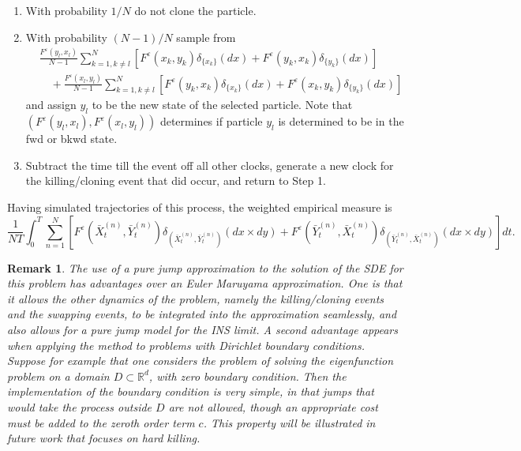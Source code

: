 \documentclass[english,11pt]{article}%
\newtheorem{remark}[theorem]{Remark}
\numberwithin{equation}{section}
\numberwithin{example}{section}
\numberwithin{theorem}{section}
\begin{document}
\begin{enumerate}
\begin{enumerate}
\item With probability $1/N$ do not clone the particle.

\item With probability $(N-1)/N$ sample from
\begin{align*}
&  \frac{F^{\varepsilon}(y_{l},x_{l})}{N-1}\sum_{k=1,k\neq l}^{N}\left[
F^{\varepsilon}(x_{k},y_{k})\delta_{\{x_{k}\}}(dx)+F^{\varepsilon}(y_{k}%
,x_{k})\delta_{\{y_{k}\}}(dx)\right] \\
&  \quad+\frac{F^{\varepsilon}(x_{l},y_{l})}{N-1}\sum_{k=1,k\neq l}^{N}\left[
F^{\varepsilon}(y_{k},x_{k})\delta_{\{x_{k}\}}(dx)+F^{\varepsilon}(x_{k}%
,y_{k})\delta_{\{y_{k}\}}(dx)\right]
\end{align*}
and assign $y_{l}$ to be the new state of the selected particle. Note that
$(F^{\varepsilon}(y_{l},x_{l}),F^{\varepsilon}(x_{l},y_{l}))$ determines if
particle $y_{l}$ is determined to be in the fwd or bkwd state.


\item Subtract the time till the event off all other clocks, generate a new
clock for the killing/cloning event that did occur, and return to Step 1.
\end{enumerate}
\end{enumerate}

Having simulated trajectories of this process, the weighted empirical measure
is
\[
\frac{1}{NT}\int_{0}^{T}\sum_{n=1}^{N}\left[  F^{\varepsilon}(\bar{X}%
_{t}^{(n)},\bar{Y}_{t}^{(n)})\delta_{(\bar{X}_{t}^{(n)},\bar{Y}_{t}^{(n)}%
)}(dx\times dy)+F^{\varepsilon}(\bar{Y}_{t}^{(n)},\bar{X}_{t}^{(n)}%
)\delta_{(\bar{Y}_{t}^{(n)},\bar{X}_{t}^{(n)})}(dx\times dy)\right]  dt.
\]


\begin{remark}
\label{rem:jump} The use of a pure jump approximation to the solution of the
SDE for this problem has advantages over an Euler Maruyama approximation. One
is that it allows the other dynamics of the problem, namely the
killing/cloning events and the swapping events, to be integrated into the
approximation seamlessly, and also allows for a pure jump model for the INS
limit. A second advantage appears when applying the method to problems with
Dirichlet boundary conditions. Suppose for example that one considers the
problem of solving the eigenfunction problem on a domain $D\subset
\mathbb{R}^{d}$, with zero boundary condition. Then the implementation of the
boundary condition is very simple, in that jumps that would take the process
outside $D$ are not allowed, though an appropriate cost must be added to the
zeroth order term $c$. This property will be illustrated in future work that
focuses on hard killing.
\end{remark}
\end{document}
